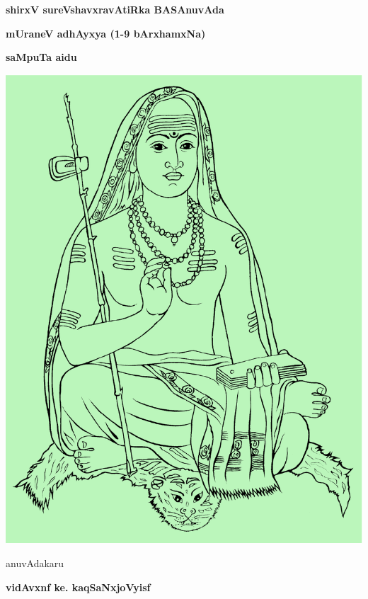 \documentclass{book}
\begin{document}
\pagecolor{cblue}
\mbox{}\thispagestyle{empty}
\vskip 1.5cm
\begin{center}
{\Huge\bfseries shirxV sureVshavxravAtiRka BASAnuvAda}
\bigskip

{\Large\bfseries mUraneV adhAyxya (1-9 bArxhamxNa)}
\bigskip

{\Large\bfseries saMpuTa aidu}
\vfill

\includegraphics[scale=0.6]{shankaracharya.eps}

\vfill

anuvAdakaru
\smallskip

{\large\bfseries vidAvxnf ke. kaqSaNxjoVyisf}
\vskip 2cm

\end{center}
\end{document}
